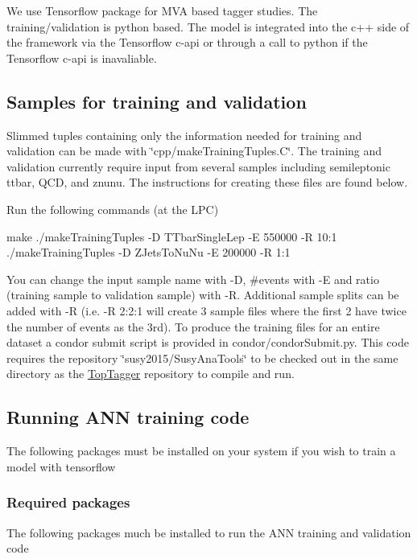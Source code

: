 We use Tensorflow package for M\-V\-A based tagger studies. The training/validation is python based. The model is integrated into the c++ side of the framework via the Tensorflow c-\/api or through a call to python if the Tensorflow c-\/api is inavaliable.

\subsection*{Samples for training and validation}

Slimmed tuples containing only the information needed for training and validation can be made with \char`\"{}cpp/make\-Training\-Tuples.\-C\char`\"{}. The training and validation currently require input from several samples including semileptonic ttbar, Q\-C\-D, and znunu. The instructions for creating these files are found below.

Run the following commands (at the L\-P\-C)


\begin{DoxyCode}
make 
./makeTrainingTuples -D TTbarSingleLep -E 550000 -R 10:1
./makeTrainingTuples -D ZJetsToNuNu -E 200000 -R 1:1
\end{DoxyCode}


You can change the input sample name with -\/\-D, \#events with -\/\-E and ratio (training sample to validation sample) with -\/\-R. Additional sample splits can be added with -\/\-R (i.\-e. -\/\-R 2\-:2\-:1 will create 3 sample files where the first 2 have twice the number of events as the 3rd). To produce the training files for an entire dataset a condor submit script is provided in condor/condor\-Submit.\-py. This code requires the repository \char`\"{}susy2015/\-Susy\-Ana\-Tools\char`\"{} to be checked out in the same directory as the \hyperlink{classTopTagger}{Top\-Tagger} repository to compile and run.

\subsection*{Running A\-N\-N training code}

The following packages must be installed on your system if you wish to train a model with tensorflow

\subsubsection*{Required packages}

The following packages much be installed to run the A\-N\-N training and validation code

